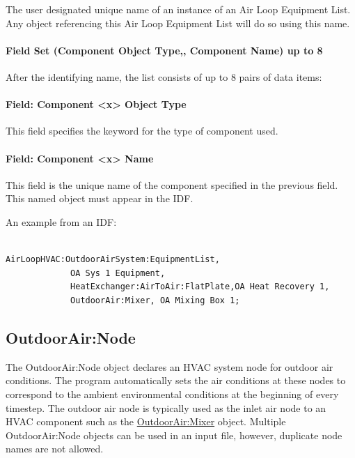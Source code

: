 The user designated unique name of an instance of an Air Loop Equipment List. Any object referencing this Air Loop Equipment List will do so using this name.

\paragraph{Field Set (Component Object Type,, Component Name) up to 8}\label{field-set-component-object-type-component-name-up-to-8}

After the identifying name, the list consists of up to 8 pairs of data items:

\paragraph{Field: Component \textless{}x\textgreater{} Object Type}\label{field-component-x-object-type}

This field specifies the keyword for the type of component used.

\paragraph{Field: Component \textless{}x\textgreater{} Name}\label{field-component-x-name}

This field is the unique name of the component specified in the previous field. This named object must appear in the IDF.

An example from an IDF:

\begin{lstlisting}

AirLoopHVAC:OutdoorAirSystem:EquipmentList,
             OA Sys 1 Equipment,
             HeatExchanger:AirToAir:FlatPlate,OA Heat Recovery 1,
             OutdoorAir:Mixer, OA Mixing Box 1;
\end{lstlisting}

\subsection{OutdoorAir:Node}\label{outdoorairnode}

The OutdoorAir:Node object declares an HVAC system node for outdoor air conditions. The program automatically sets the air conditions at these nodes to correspond to the ambient environmental conditions at the beginning of every timestep. The outdoor air node is typically used as the inlet air node to an HVAC component such as the \hyperref[outdoorairmixer]{OutdoorAir:Mixer} object. Multiple OutdoorAir:Node objects can be used in an input file, however, duplicate node names are not allowed.

